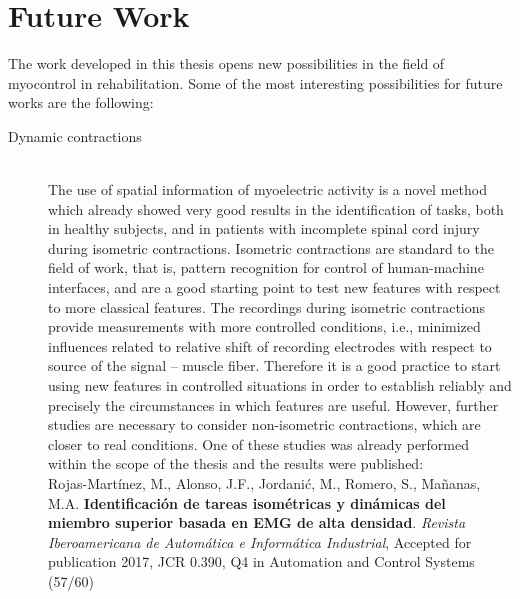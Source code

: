 \section{Future Work}
\label{sec:fw}
The work developed in this thesis opens new possibilities in the field of myocontrol in rehabilitation. Some of the most interesting possibilities for future works are the following: 

\begin{description}
\item[Dynamic contractions] \hfill \\ 
	The use of spatial information of myoelectric activity is a novel method which already showed very good results in the identification of tasks, both in healthy subjects, and in patients with incomplete spinal cord injury during isometric contractions. Isometric contractions are standard to the field of work, that is, pattern recognition for control of human-machine interfaces, and are a good starting point to test new features with respect to more classical features. The recordings during isometric contractions provide measurements with more controlled conditions, i.e., minimized influences related to relative shift of recording electrodes with respect to source of the signal – muscle fiber. Therefore it is a good practice to start using new features in controlled situations in order to establish reliably and precisely the circumstances in which features are useful. However, further studies are necessary to consider non-isometric contractions, which are closer to real conditions. One of these studies was already performed within the scope of the thesis and the results were published:\\
	\small{Rojas-Martínez, M., Alonso, J.F., Jordanić, M., Romero, S., Mañanas, M.A. \textbf{Identificación de tareas isométricas y dinámicas del miembro superior basada en EMG de alta densidad}. \textit{Revista Iberoamericana de Automática e Informática Industrial}, Accepted for publication 2017, JCR 0.390, Q4 in Automation and Control Systems (57/60)}
	
	
	

\end{description}
